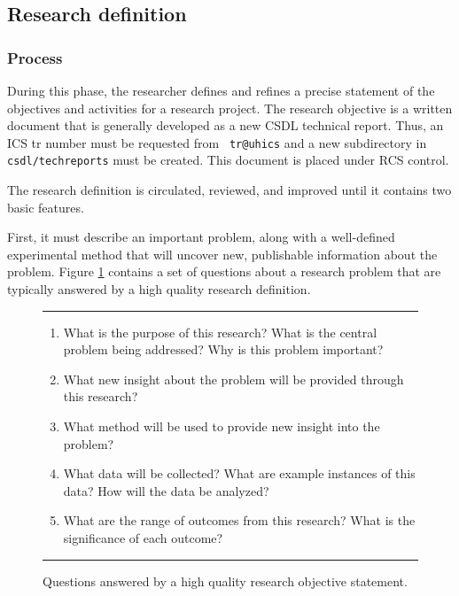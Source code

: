 

\subsection{Research definition}

\subsubsection*{Process}

During this phase, the researcher defines and refines a precise statement
of the objectives and activities for a research project.  The research
objective is a written document that is generally developed as a new CSDL
technical report. Thus, an ICS tr number must be requested from {\tt
tr@uhics} and a new subdirectory in {\tt csdl/techreports} must be created.
This document is placed under RCS control.

The research definition is circulated, reviewed, and improved
until it contains two basic features.  

First, it must describe an important problem, along with a well-defined
experimental method that will uncover new, publishable information about
the problem.  Figure \ref{fig:objective-questions} contains a set of
questions about a research problem that are typically answered by a high
quality research definition.


\begin{figure}
\hrule
\small
\begin{enumerate}
\item What is the purpose of this research?  What is the central problem being
  addressed?  Why is this problem important?
\item What new insight about the problem will be provided through this
  research? 
\item What method will be used to provide new insight into the problem?
\item What data will be collected?  What are example instances of this
  data?  How will the data be analyzed?
\item What are the range of outcomes from this research?  What is the
  significance of each outcome?
\end{enumerate}
\hrule
\caption {Questions answered by a high quality research objective statement.}
\label{fig:objective-questions}
\end{figure}


